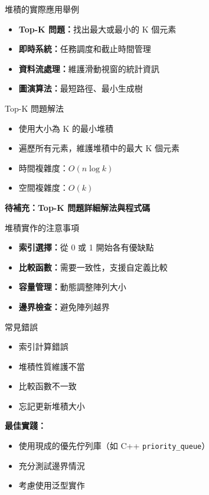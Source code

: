 \documentclass{beamer}
\begin{document}
\begin{frame}{堆積的實際應用舉例}
\begin{itemize}
    \item \textbf{Top-K 問題：}找出最大或最小的 K 個元素
    \item \textbf{即時系統：}任務調度和截止時間管理
    \item \textbf{資料流處理：}維護滑動視窗的統計資訊
    \item \textbf{圖演算法：}最短路徑、最小生成樹
\end{itemize}

\vspace{1em}
\begin{block}{Top-K 問題解法}
\begin{itemize}
    \item 使用大小為 K 的最小堆積
    \item 遍歷所有元素，維護堆積中的最大 K 個元素
    \item 時間複雜度：$O(n \log k)$
    \item 空間複雜度：$O(k)$
\end{itemize}
\end{block}

\vspace{1em}
\textbf{待補充：Top-K 問題詳細解法與程式碼}
\end{frame}

\begin{frame}{堆積實作的注意事項}
\begin{itemize}
    \item \textbf{索引選擇：}從 0 或 1 開始各有優缺點
    \item \textbf{比較函數：}需要一致性，支援自定義比較
    \item \textbf{容量管理：}動態調整陣列大小
    \item \textbf{邊界檢查：}避免陣列越界
\end{itemize}

\vspace{1em}
\begin{block}{常見錯誤}
\begin{itemize}
    \item 索引計算錯誤
    \item 堆積性質維護不當
    \item 比較函數不一致
    \item 忘記更新堆積大小
\end{itemize}
\end{block}

\vspace{1em}
\textbf{最佳實踐：}
\begin{itemize}
    \item 使用現成的優先佇列庫（如 C++ \texttt{priority\_queue}）
    \item 充分測試邊界情況
    \item 考慮使用泛型實作
\end{itemize}
\end{frame}
\end{document}
